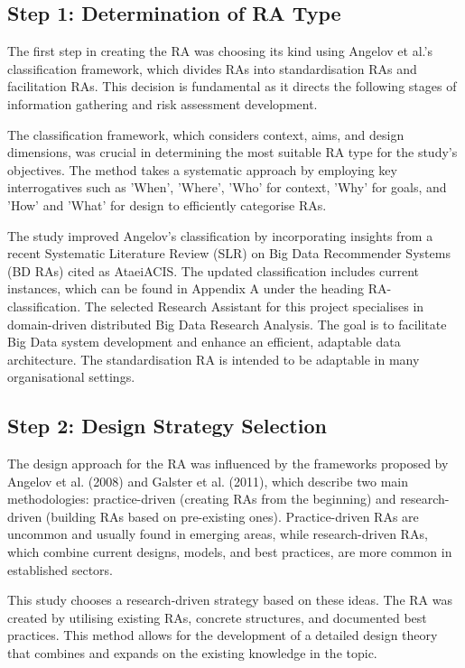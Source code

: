 \documentclass[journal]{IEEEtran}
\begin{document}
\subsection{Step 1: Determination of RA Type}

The first step in creating the RA was choosing its kind using Angelov et al.'s classification framework, which divides RAs into standardisation RAs and facilitation RAs. This decision is fundamental as it directs the following stages of information gathering and risk assessment development. 

The classification framework, which considers context, aims, and design dimensions, was crucial in determining the most suitable RA type for the study's objectives. The method takes a systematic approach by employing key interrogatives such as 'When', 'Where', 'Who' for context, 'Why' for goals, and 'How' and 'What' for design to efficiently categorise RAs.

The study improved Angelov's classification by incorporating insights from a recent Systematic Literature Review (SLR) on Big Data Recommender Systems (BD RAs) cited as AtaeiACIS. The updated classification includes current instances, which can be found in Appendix A under the heading RA-classification. The selected Research Assistant for this project specialises in domain-driven distributed Big Data Research Analysis. The goal is to facilitate Big Data system development and enhance an efficient, adaptable data architecture. The standardisation RA is intended to be adaptable in many organisational settings.


\subsection{Step 2: Design Strategy Selection}

The design approach for the RA was influenced by the frameworks proposed by Angelov et al. (2008) and Galster et al. (2011), which describe two main methodologies: practice-driven (creating RAs from the beginning) and research-driven (building RAs based on pre-existing ones). Practice-driven RAs are uncommon and usually found in emerging areas, while research-driven RAs, which combine current designs, models, and best practices, are more common in established sectors.

This study chooses a research-driven strategy based on these ideas. The RA was created by utilising existing RAs, concrete structures, and documented best practices. This method allows for the development of a detailed design theory that combines and expands on the existing knowledge in the topic.
\end{document}

